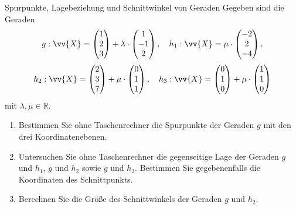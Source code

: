 \begin{uebung}{Spurpunkte, Lagebeziehung und Schnittwinkel von Geraden}
Gegeben sind die Geraden
\[g: \vv{X} = \begin{pmatrix} 1\\ 2\\ 3\end{pmatrix} + \lambda\cdot\begin{pmatrix} 1\\ -1\\ 2\end{pmatrix},\quad
h_1: \vv{X} = \mu\cdot\begin{pmatrix} -2\\ 2\\ -4\end{pmatrix},\]
\[h_2: \vv{X} = \begin{pmatrix} 2\\ 3\\ 7\end{pmatrix} + \mu\cdot\begin{pmatrix} 0\\ 1\\ 1\end{pmatrix},\quad
h_3: \vv{X} = \begin{pmatrix} 0\\ 1\\ 0\end{pmatrix} + \mu\cdot\begin{pmatrix} 1\\ 1\\ 0\end{pmatrix}\]
mit $\lambda,\mu\in\mathds{R}$.
\begin{enumerate}[label=\alph*)]
  \item Bestimmen Sie ohne Taschenrechner die Spurpunkte der Geraden $g$ mit den drei Koordinatenebenen.
  \item Untersuchen Sie ohne Taschenrechner die gegenseitige Lage der Geraden $g$ und $h_1$, $g$ und $h_2$ sowie $g$ und $h_3$. Bestimmen Sie gegebenenfalls die Koordinaten des Schnittpunkts.
  \item Berechnen Sie die Größe des Schnittwinkels der Geraden $g$ und $h_2$.
\end{enumerate}
\end{uebung}


